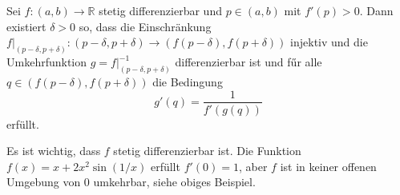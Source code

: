 \documentclass[../main.tex]{subfiles}
\begin{document}
\begin{inverse}
  Sei $f \colon (a, b) \to \mathbb{R}$ stetig
  differenzierbar und $p \in (a, b)$ mit $f'(p) > 0$.
  Dann existiert $\delta > 0$ so, dass
  die Einschränkung $f|_{(p - \delta, p + \delta)}
  \colon (p - \delta, p + \delta) \to
  (f(p - \delta), f(p + \delta))$
  injektiv und die Umkehrfunktion
  $g = f|_{(p - \delta, p + \delta)}^{-1}$ 
  differenzierbar ist und fűr alle
  $q \in (f(p-\delta), f(p + \delta))$ die Bedingung
  \[
    g'(q) = \frac{1}{f'(g(q))}
  \]
  erfüllt.
\end{inverse}

\begin{remark}
  Es ist wichtig, dass
  $f$ stetig differenzierbar ist.
  Die Funktion $f(x) = x + 2 x^2 \sin(1/x)$ 
  erfüllt $f'(0) = 1$, aber  $f$ ist in
  keiner offenen Umgebung von $0$ 
  umkehrbar, siehe obiges Beispiel.
\end{remark}
\end{document}
